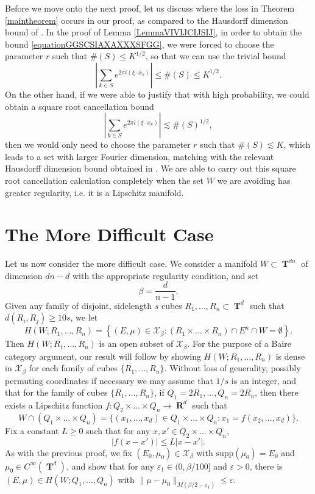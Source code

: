 \documentclass[12pt,reqno]{article}
\numberwithin{equation}{section}
\DeclareMathOperator{\RR}{\mathbf{R}}
\DeclareMathOperator{\TT}{\mathbf{T}}
\begin{document}
Before we move onto the next proof, let us discuss where the loss in Theorem \ref{maintheorem} occurs in our proof, as compared to the Hausdorff dimension bound of \cite{OurPaper}. In the proof of Lemma \ref{LemmaVIVIJCIJSIJ}, in order to obtain the bound \eqref{equationGGSCSIAXAXXXSFGG}, we were forced to choose the parameter $r$ such that $\#(S) \leq K^{1/2}$, so that we can use the trivial bound
%
\begin{equation}
    \left| \sum_{k \in S} e^{2 \pi i (\xi \cdot x_k)} \right| \leq \#(S) \leq K^{1/2}.
\end{equation}
%
On the other hand, if we were able to justify that with high probability, we could obtain a square root cancellation bound
%
\begin{equation}
    \left| \sum_{k \in S} e^{2 \pi i (\xi \cdot x_k)} \right| \lesssim \#(S)^{1/2},
\end{equation}
%
then we would only need to choose the parameter $r$ such that $\#(S) \lesssim K$, which leads to a set with larger Fourier dimension, matching with the relevant Hausdorff dimension bound obtained in \cite{OurPaper}. We are able to carry out this square root cancellation calculation completely when the set $W$ we are avoiding has greater regularity, i.e. it is a Lipschitz manifold.

\section{The More Difficult Case}

Let us now consider the more difficult case. We consider a manifold $W \subset \TT^{dn}$ of dimension $dn - d$ with the appropriate regularity condition, and set
%
\[ \beta = \frac{d}{n-1}. \]
%
Given any family of disjoint, sidelength $s$ cubes $R_1,\dots,R_n \subset \TT^d$ such that $d(R_i,R_j) \geq 10s$, we let
%
\[ H(W;R_1,\dots,R_n) = \left\{ (E,\mu) \in \mathcal{X}_\beta: (R_1 \times \dots \times R_n) \cap E^n \cap W = \emptyset \right\}. \]
%
Then $H(W;R_1,\dots,R_n)$ is an open subset of $\mathcal{X}_\beta$. For the purpose of a Baire category argument, our result will follow by showing $H(W;R_1,\dots,R_n)$ is dense in $\mathcal{X}_\beta$ for each family of cubes $\{ R_1,\dots, R_n \}$. Without loss of generality, possibly permuting coordinates if necessary we may assume that $1/s$ is an integer, and that for the family of cubes $\{ R_1,\dots, R_n \}$, if $Q_1 = 2R_1,\dots, Q_n = 2R_n$, then there exists a Lipschitz function $f: Q_2 \times \dots \times Q_n \to \RR^d$ such that
%
\[ W \cap (Q_1 \times \dots \times Q_n) = \{ (x_1,\dots,x_d) \in Q_1 \times \dots \times Q_n : x_1 = f(x_2,\dots,x_d) \}. \]
%
Fix a constant $L \geq 0$ such that for any $x,x' \in Q_2 \times \dots \times Q_n$,
%
\begin{equation}
    |f(x - x')| \leq L |x - x'|.
\end{equation}
%
As with the previous proof, we fix $(E_0,\mu_0) \in \mathcal{X}_\beta$ with $\text{supp}(\mu_0) = E_0$ and $\mu_0 \in C^\infty(\TT^d)$, and show that for any $\varepsilon_1 \in (0,\beta/100]$ and $\varepsilon > 0$, there is $(E,\mu) \in H(W;Q_1,\dots,Q_n)$ with $\| \mu - \mu_0 \|_{M(\beta/2-\varepsilon_1)} \leq \varepsilon$.
\end{document}
